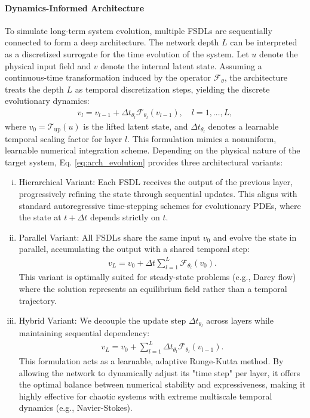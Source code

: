 \documentclass[final,3p,times]{elsarticle}
\begin{document}
\paragraph{Dynamics-Informed Architecture}
To simulate long-term system evolution, multiple FSDLs are sequentially connected to form a deep architecture. The network depth $L$ can be interpreted as a discretized surrogate for the time evolution of the system. Let $u$ denote the physical input field and $v$ denote the internal latent state. Assuming a continuous-time transformation induced by the operator $\mathscr{F}_\theta$, the architecture treats the depth $L$ as temporal discretization steps, yielding the discrete evolutionary dynamics:
\begin{align}
v_l = v_{l-1} + \Delta t_{\theta_l} \mathscr{F}_{\theta_l}(v_{l-1}), \quad l=1, \dots, L,
\label{eq:arch_evolution}
\end{align}
where $v_0 = \mathscr{T}_{\text{up}}(u)$ is the lifted latent state, and $\Delta t_{\theta_l}$ denotes a learnable temporal scaling factor for layer $l$. This formulation mimics a nonuniform, learnable numerical integration scheme. Depending on the physical nature of the target system, Eq. \eqref{eq:arch_evolution} provides three architectural variants:

\begin{enumerate}[(i)]
    \item Hierarchical Variant: Each FSDL receives the output of the previous layer, progressively refining the state through sequential updates. This aligns with standard autoregressive time-stepping schemes for evolutionary PDEs, where the state at $t+\Delta t$ depends strictly on $t$.
    \item Parallel Variant: All FSDLs share the same input $v_0$ and evolve the state in parallel, accumulating the output with a shared temporal step:
    \begin{align}
    v_{L} = v_0 + \Delta t \sum_{l=1}^{L} \mathscr{F}_{\theta_l}(v_0).
    \label{eq:arch_parallel}
    \end{align}
    This variant is optimally suited for steady-state problems (e.g., Darcy flow) where the solution represents an equilibrium field rather than a temporal trajectory.
    \item Hybrid Variant: We decouple the update step $\Delta t_{\theta_l}$ across layers while maintaining sequential dependency:
    \begin{align}
    v_{L} = v_0 + \sum_{l=1}^{L}  \Delta t_{\theta_l} \mathscr{F}_{\theta_l}(v_{l-1}).
    \label{eq:arch_hybrid}
    \end{align}
    This formulation acts as a learnable, adaptive Runge-Kutta method. By allowing the network to dynamically adjust its "time step" per layer, it offers the optimal balance between numerical stability and expressiveness, making it highly effective for chaotic systems with extreme multiscale temporal dynamics (e.g., Navier-Stokes).
\end{enumerate}
\end{document}
